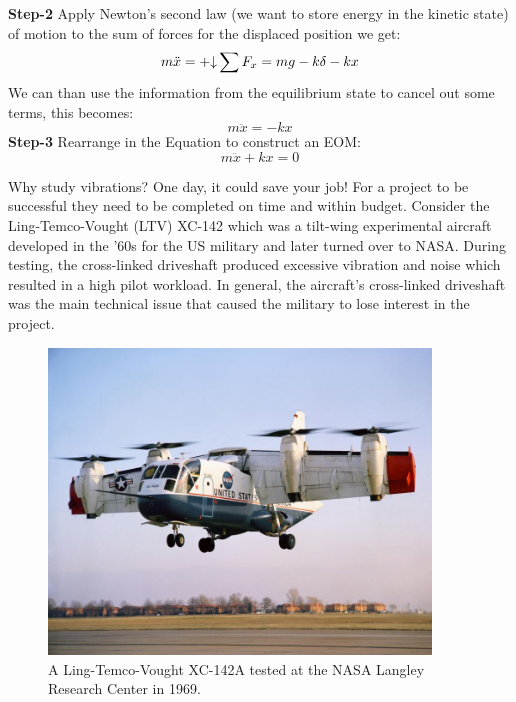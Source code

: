 \documentclass[12pt,letter]{article}
\begin{document}
\begin{example}
			\noindent \textbf{Step-2} Apply Newton's second law (we want to store energy in the kinetic state) of motion to the sum of forces for the displaced position we get: 		
			\begin{equation}
				m\ddot{x} = \mathbin{+\mathord\downarrow} \sum F_x =mg -k\delta -kx
			\end{equation}
			We can than use the information from the equilibrium state to cancel out some terms, this becomes:
			\begin{equation}
				m\ddot{x} = -kx
			\end{equation}				
			\textbf{Step-3} Rearrange in the Equation to construct an EOM: 					
			\begin{equation}
				m\ddot{x} + kx = 0
			\end{equation}			
		\end{example}		


		\begin{vibration_case_study}
			Why study vibrations? One day, it could save your job! For a project to be successful they need to be completed on time and within budget. Consider the Ling-Temco-Vought (LTV) XC-142  which was a tilt-wing experimental aircraft developed in the '60s for the US military and later turned over to NASA. During testing, the cross-linked driveshaft produced excessive vibration and noise which resulted in a high pilot workload. In general, the aircraft's cross-linked driveshaft was the main technical issue that caused the military to lose interest in the project. 
			
			\begin{figure}[H]
				\centering
				\includegraphics[width=4in]{../figures/Ling_Temco_Vought_XC_142A.jpg}
				\caption{A Ling-Temco-Vought XC-142A tested at the NASA Langley Research Center in 1969. \protect\footnotemark[1]}
			\end{figure}
		\end{vibration_case_study}


	
\end{document}
